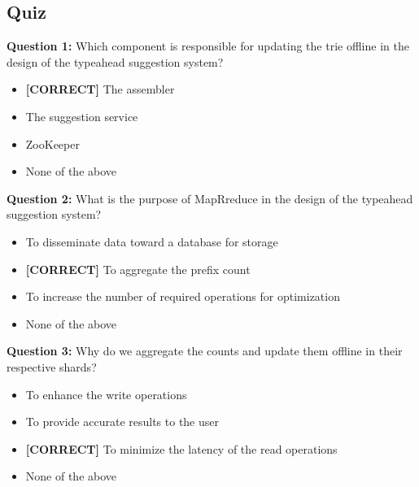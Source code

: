 

\subsection*{Quiz}
\vspace{0.3cm}
\noindent
\textbf{Question 1:} Which component is responsible for updating the trie offline in the design of the typeahead suggestion system?
\\[0.2cm]
\begin{itemize}
 \item \textbf{[CORRECT]} The assembler
 \item The suggestion service
 \item ZooKeeper
 \item None of the above
\end{itemize}
\vspace{0.3cm}
\noindent
\textbf{Question 2:} What is the purpose of MapRreduce in the design of the typeahead suggestion system?
\\[0.2cm]
\begin{itemize}
 \item To disseminate data toward a database for storage
 \item \textbf{[CORRECT]} To aggregate the prefix count
 \item To increase the number of required operations for optimization
 \item None of the above
\end{itemize}
\vspace{0.3cm}
\noindent
\textbf{Question 3:} Why do we aggregate the counts and update them offline in their respective shards?
\\[0.2cm]
\begin{itemize}
 \item To enhance the write operations
 \item To provide accurate results to the user
 \item \textbf{[CORRECT]} To minimize the latency of the read operations
 \item None of the above
\end{itemize}
